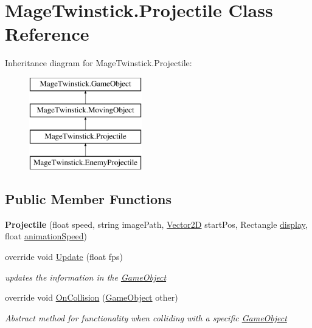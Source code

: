 \hypertarget{class_mage_twinstick_1_1_projectile}{}\section{Mage\+Twinstick.\+Projectile Class Reference}
\label{class_mage_twinstick_1_1_projectile}
Inheritance diagram for Mage\+Twinstick.\+Projectile\+:\begin{figure}[H]
\begin{center}
\leavevmode
\includegraphics[height=4.000000cm]{class_mage_twinstick_1_1_projectile}
\end{center}
\end{figure}
\subsection*{Public Member Functions}
\begin{DoxyCompactItemize}
\item 
\hypertarget{class_mage_twinstick_1_1_projectile_a2e18fb2d662c973c867069a248b5a5ed}{}{\bfseries Projectile} (float speed, string image\+Path, \hyperlink{class_mage_twinstick_1_1_vector2_d}{Vector2\+D} start\+Pos, Rectangle \hyperlink{class_mage_twinstick_1_1_game_object_a5807df7f837dc87c8955a008d0b27b50}{display}, float \hyperlink{class_mage_twinstick_1_1_game_object_a5d21c31402c27c5a19f2a62d98720456}{animation\+Speed})\label{class_mage_twinstick_1_1_projectile_a2e18fb2d662c973c867069a248b5a5ed}

\item 
override void \hyperlink{class_mage_twinstick_1_1_projectile_a9208eff25bc92289191d5470bbc7015a}{Update} (float fps)
\begin{DoxyCompactList}\small\item\em updates the information in the \hyperlink{class_mage_twinstick_1_1_game_object}{Game\+Object} \end{DoxyCompactList}\item 
override void \hyperlink{class_mage_twinstick_1_1_projectile_ad646d013997eceb12a0ac2f5df56d3bb}{On\+Collision} (\hyperlink{class_mage_twinstick_1_1_game_object}{Game\+Object} other)
\begin{DoxyCompactList}\small\item\em Abstract method for functionality when colliding with a specific \hyperlink{class_mage_twinstick_1_1_game_object}{Game\+Object} \end{DoxyCompactList}\end{DoxyCompactItemize}
